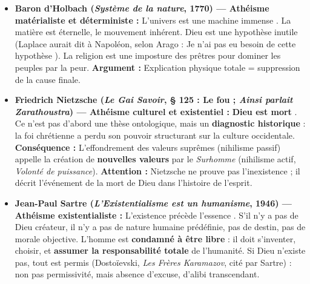 \documentclass[11pt]{article}
\begin{document}
\begin{propriete}
\begin{itemize}
    \item \textbf{Baron d'Holbach (\emph{Système de la nature}, 1770) — Athéisme matérialiste et déterministe :} \guillemotleft L'univers est une machine immense \guillemotright. La matière est éternelle, le mouvement inhérent. Dieu est une \guillemotleft hypothèse inutile \guillemotright (Laplace aurait dit à Napoléon, selon Arago : \guillemotleft Je n'ai pas eu besoin de cette hypothèse \guillemotright). La religion est une \guillemotleft imposture \guillemotright des prêtres pour dominer les peuples par la peur. \textbf{Argument :} Explication physique totale = suppression de la cause finale.
    \item \textbf{Friedrich Nietzsche (\emph{Le Gai Savoir}, § 125 : \guillemotleft Le fou \guillemotright ; \emph{Ainsi parlait Zarathoustra}) — Athéisme culturel et existentiel :} \guillemotleft \textbf{Dieu est mort} \guillemotright. Ce n'est pas d'abord une thèse ontologique, mais un \textbf{diagnostic historique} : la foi chrétienne a perdu son pouvoir structurant sur la culture occidentale. \textbf{Conséquence :} L'effondrement des \guillemotleft valeurs suprêmes \guillemotright (nihilisme passif) appelle la création de \textbf{nouvelles valeurs} par le \emph{Surhomme} (nihilisme actif, \emph{Volonté de puissance}). \textbf{Attention :} Nietzsche ne \guillemotleft prouve \guillemotright pas l'inexistence ; il décrit l'\guillemotleft événement \guillemotright de la mort de Dieu dans l'histoire de l'esprit.
    \item \textbf{Jean-Paul Sartre (\emph{L'Existentialisme est un humanisme}, 1946) — Athéisme existentialiste :} \guillemotleft L'existence précède l'essence \guillemotright. S'il n'y a pas de Dieu créateur, il n'y a pas de \guillemotleft nature humaine \guillemotright prédéfinie, pas de destin, pas de morale objective. L'homme est \textbf{condamné à être libre} : il doit s'inventer, choisir, et \textbf{assumer la responsabilité totale} de l'humanité. \guillemotleft Si Dieu n'existe pas, tout est permis \guillemotright (Dostoïevski, \emph{Les Frères Karamazov}, cité par Sartre) : non pas permissivité, mais absence d'excuse, d'alibi transcendant.
\end{itemize}
\end{propriete}
\end{document}

